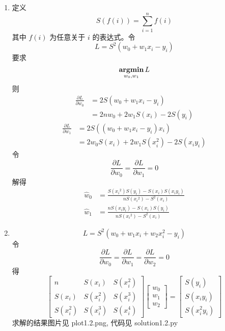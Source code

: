 \documentclass[11pt,letter,notitlepage]{article}
\DeclareMathOperator*{\argmin}{\bf argmin}
\begin{document}
\begin{solution}
    \begin{enumerate}
        \item 定义
              $$S(f(i))=\sum_{i=1}^{n}{f(i)}$$
              其中 $f(i)$ 为任意关于 $i$ 的表达式。令
              $$ L = S^2(w_0+w_1 x_i-y_i)$$
              要求
              $$\argmin_{w_0,w_1}  L$$
              则
              $$\begin{aligned}
                      \frac{\partial L}{\partial w_0}
                       & = 2 S(w_0+w_1 x_i-y_i)           \\
                       & = 2nw_0 + 2w_1 S(x_i) - 2 S(y_i)
                  \end{aligned}$$
              $$\begin{aligned}
                      \frac{\partial L}{\partial w_1}
                       & = 2 S((w_0+w_1 x_i-y_i)x_i)                   \\
                       & = 2w_0 S(x_i) + 2 w_1 S(x_i^2) - 2 S(x_i y_i)
                  \end{aligned}$$
              令
              $$\frac{\partial L}{\partial w_0} = \frac{\partial L}{\partial w_1} = 0$$
              解得
              $$\begin{aligned}
                      \hat{w}_0 & = \frac
                      {S({x_i}^2) S(y_i) - S(x_i) S(x_i y_i)}
                      {n S({x_i}^2) - S^2(x_i)} \\
                      \hat{w}_1 & = \frac
                      {n S(x_i y_i) - S(x_i) S(y_i)}
                      {n S({x_i}^2) - S^2(x_i)}
                  \end{aligned}$$
        \item $$L=S^2(w_0+w_1 x_i +w_2 x_i^2 -y_i)$$
              令
              $$\frac{\partial L}{\partial w_0}
                  =\frac{\partial L}{\partial w_1}
                  =\frac{\partial L}{\partial w_2}=0$$
              得
              $$\begin{bmatrix}
                      n        & S(x_i)   & S(x_i^2) \\
                      S(x_i)   & S(x_i^2) & S(x_i^3) \\
                      S(x_i^2) & S(x_i^3) & S(x_i^4)
                  \end{bmatrix}
                  \begin{bmatrix}
                      w_0 \\  w_1 \\  w_2
                  \end{bmatrix}
                  =\begin{bmatrix}
                      S(y_i) \\ S(x_i y_i) \\ S(x_i^2 y_i)
                  \end{bmatrix}$$
              求解的结果图片见 plot1.2.png, 代码见 solution1.2.py


\end{enumerate}
\end{solution}
\end{document}

